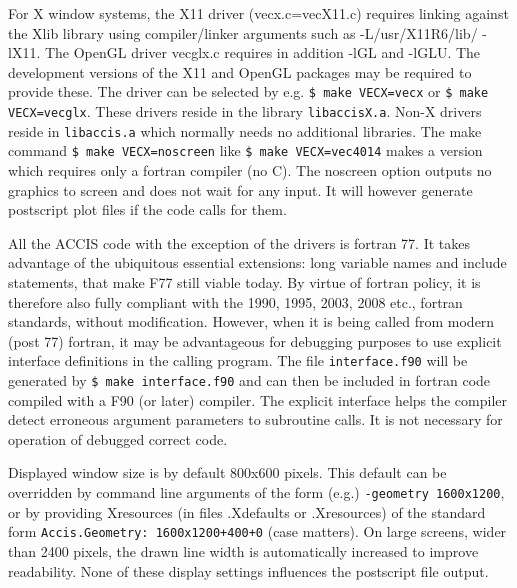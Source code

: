 \documentclass[12pt]{article}
\begin{document}
For X window systems, the X11 driver (vecx.c=vecX11.c) requires
linking against the Xlib library using compiler/linker arguments such
as -L/usr/X11R6/lib/ -lX11.  The OpenGL driver vecglx.c requires in
addition -lGL and -lGLU. The development versions of the X11 and
OpenGL packages may be required to provide these. The driver can be
selected by e.g. \verb!$ make VECX=vecx! or \verb!$ make VECX=vecglx!.
These drivers reside in the library \verb!libaccisX.a!.  Non-X drivers
reside in \verb!libaccis.a! which normally needs no additional
libraries.  The make command \verb!$ make VECX=noscreen!  like
\verb!$ make VECX=vec4014!  makes a version which requires only a
fortran compiler (no C). The noscreen option outputs no graphics to
screen and does not wait for any input. It will however generate
postscript plot files if the code calls for them.


All the ACCIS code with the exception of the drivers is fortran 77.
It takes advantage of the ubiquitous essential extensions: long
variable names and include statements, that make F77 still viable
today.  By virtue of fortran policy, it is therefore also fully
compliant with the 1990, 1995, 2003, 2008 etc., fortran standards,
without modification. However, when it is being called from modern
(post 77) fortran, it may be advantageous for debugging purposes to
use explicit interface definitions in the calling program. The file
\verb!interface.f90! will be generated by \verb!$ make interface.f90!
and can then be included in fortran code compiled with a F90 (or
later) compiler. The explicit interface helps the compiler detect
erroneous argument parameters to subroutine calls. It is not necessary
for operation of debugged correct code.

Displayed window size is by default 800x600 pixels. This default can be
overridden by command line arguments of the form (e.g.)
\verb!-geometry 1600x1200!, or by providing Xresources (in files
.Xdefaults or .Xresources) of the standard form
\verb!Accis.Geometry: 1600x1200+400+0! (case matters). On large
screens, wider than 2400 pixels, the drawn line width is automatically
increased to improve readability. None of these display settings
influences the postscript file output.
\end{document}
